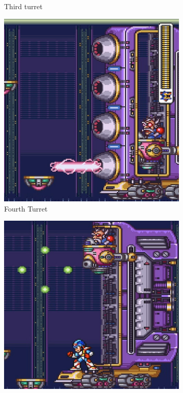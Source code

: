 \begin{figure}[htp]
\begin{subfigure}{.32\linewidth}
		\caption{Third turret}
	\end{subfigure}
	\begin{subfigure}{.32\linewidth}
		\centering
		\includegraphics[width=\linewidth]{figures/X2/Hunter_stages/Serges_tank_4.png}
		\caption{Fourth Turret}
	\end{subfigure}
	\begin{subfigure}{.32\linewidth}
		\centering
		\includegraphics[width=\linewidth]{figures/X2/Hunter_stages/Serges_tank_5.jpg}

\end{subfigure}
\end{figure}
